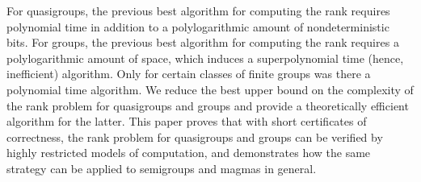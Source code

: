 \documentclass{article}
\begin{document}
%
For quasigroups, the previous best algorithm for computing the rank requires polynomial time in addition to a polylogarithmic amount of nondeterministic bits.
For groups, the previous best algorithm for computing the rank requires a polylogarithmic amount of space, which induces a superpolynomial time (hence, inefficient) algorithm.
Only for certain classes of finite groups was there a polynomial time algorithm.
We reduce the best upper bound on the complexity of the rank problem for quasigroups and groups and provide a theoretically efficient algorithm for the latter.
This paper proves that with short certificates of correctness, the rank problem for quasigroups and groups can be verified by highly restricted models of computation, and demonstrates how the same strategy can be applied to semigroups and magmas in general.
\end{document}
